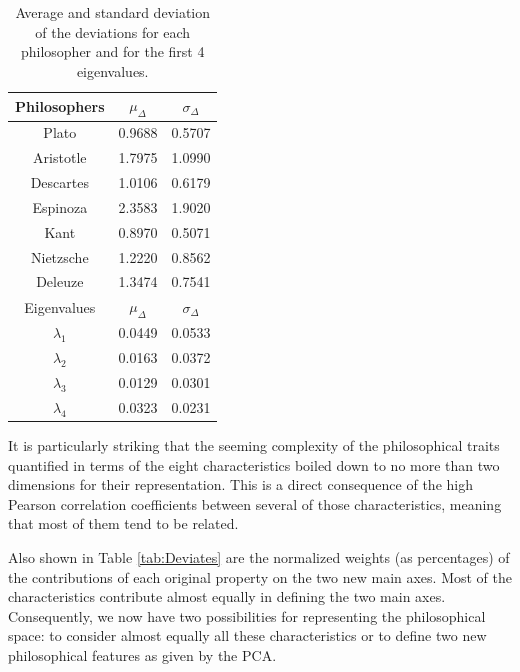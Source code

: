 \documentclass[%
 aip,
 jmp,%
 amsmath,amssymb,
 reprint,%
]{revtex4-1}
\begin{document}
\begin{table}%
\caption{\label{tab:tableD}Average and standard deviation of the 
deviations for each philosopher and for the first 
4 eigenvalues.  }

\begin{tabular}{|c||c|c|}
\hline

Philosophers & $\mu_{\Delta}$ & $\sigma_{\Delta}$ \\
\hline
Plato     & 0.9688 & 0.5707 \\
Aristotle & 1.7975 & 1.0990 \\
Descartes & 1.0106 & 0.6179 \\
Espinoza & 2.3583 & 1.9020 \\
Kant & 0.8970 & 0.5071 \\
Nietzsche & 1.2220 & 0.8562 \\
Deleuze & 1.3474 & 0.7541 \\
\hline \hline
Eigenvalues & $\mu_{\Delta}$ & $\sigma_{\Delta}$ \\
\hline
$\lambda_1$ &  0.0449 & 0.0533 \\
$\lambda_2$ &  0.0163 & 0.0372 \\
$\lambda_3$ &  0.0129 & 0.0301 \\
$\lambda_4$ &  0.0323 & 0.0231 \\
\hline

\end{tabular}
\end{table}

It is particularly striking that the seeming complexity of the
philosophical traits quantified in terms of the eight characteristics
boiled down to no more than two dimensions for their representation.
This is a direct consequence of the high Pearson correlation
coefficients between several of those characteristics, meaning that
most of them tend to be related.

Also shown in Table \ref{tab:Deviates} are the normalized weights (as
percentages) of the contributions of each original property on the two
new main axes.  Most of the characteristics contribute almost equally
in defining the two main axes.  Consequently, we now have two
possibilities for representing the philosophical space: to consider
almost equally all these characteristics or to define two new
philosophical features as given by the PCA.

\end{document}
